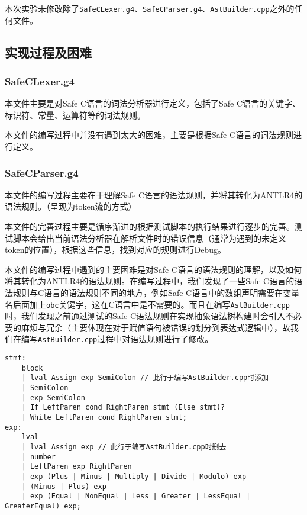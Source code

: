 \documentclass[../main.tex]{subfiles}
\begin{document}
本次实验未修改除了\texttt{SafeCLexer.g4}、\texttt{SafeCParser.g4}、\texttt{AstBuilder.cpp}之外的任何文件。

\subsection{实现过程及困难}

\subsubsection{SafeCLexer.g4}

本文件主要是对Safe C语言的词法分析器进行定义，包括了Safe C语言的关键字、标识符、常量、运算符等的词法规则。

本文件的编写过程中并没有遇到太大的困难，主要是根据Safe C语言的词法规则进行定义。

\subsubsection{SafeCParser.g4}

本文件的编写过程主要在于理解Safe C语言的语法规则，并将其转化为ANTLR4的语法规则。（呈现为token流的方式）

本文件的完善过程主要是循序渐进的根据测试脚本的执行结果进行逐步的完善。测试脚本会给出当前语法分析器在解析文件时的错误信息（通常为遇到的未定义token的位置），根据这些信息，找到对应的规则进行Debug。

本文件的编写过程中遇到的主要困难是对Safe C语言的语法规则的理解，以及如何将其转化为ANTLR4的语法规则。在编写过程中，我们发现了一些Safe C语言的语法规则与C语言的语法规则不同的地方，例如Safe C语言中的数组声明需要在变量名后面加上\texttt{obc}关键字，这在C语言中是不需要的。而且在编写\texttt{AstBuilder.cpp}时，我们发现之前通过测试的Safe C语法规则在实现抽象语法树构建时会引入不必要的麻烦与冗余（主要体现在对于赋值语句被错误的划分到表达式逻辑中），故我们在编写\texttt{AstBuilder.cpp}过程中对语法规则进行了修改。

\begin{mdframed}
	\begin{verbatim}
stmt: 
    block
    | lval Assign exp SemiColon // 此行于编写AstBuilder.cpp时添加
    | SemiColon
    | exp SemiColon
    | If LeftParen cond RightParen stmt (Else stmt)?
    | While LeftParen cond RightParen stmt;
exp:
    lval
    | lval Assign exp // 此行于编写AstBuilder.cpp时删去
    | number
    | LeftParen exp RightParen
    | exp (Plus | Minus | Multiply | Divide | Modulo) exp
    | (Minus | Plus) exp
    | exp (Equal | NonEqual | Less | Greater | LessEqual | GreaterEqual) exp;
  \end{verbatim}
\end{mdframed}
\end{document}
